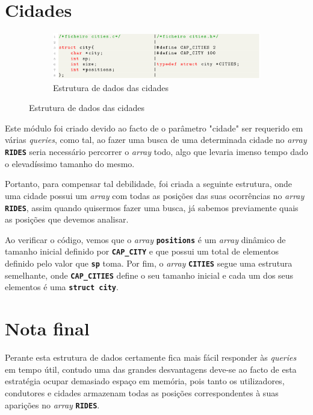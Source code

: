 \documentclass[12pt,a4paper]{report}
\begin{document}
\section{Cidades}

\begin{figure}[hbt!]
    \centering
    \begin{subfigure}{\textwidth}
        \centering
        \includegraphics[width=1\linewidth]{images/cities.png}
        \caption*{Estrutura de dados das cidades}
        \label{fig:cities}
    \end{subfigure}
\end{figure}

Este módulo foi criado devido ao facto de o parâmetro "cidade" ser requerido em várias \textit{queries}, como tal, ao fazer uma busca de uma determinada cidade no \textit{array} \textbf{\small\texttt{RIDES}} seria necessário percorrer o \textit{array} todo, algo que levaria imenso tempo dado o elevadíssimo  tamanho do mesmo.

Portanto, para compensar tal debilidade, foi criada a seguinte estrutura, onde uma cidade possui um \textit{array} com todas as posições das suas ocorrências no \textit{array} \textbf{\small\texttt{RIDES}}, assim quando quisermos fazer uma busca, já sabemos previamente quais as posições que devemos analisar.



Ao verificar o código, vemos que o \textit{array} \textbf{\small\texttt{positions}} é um \textit{array} dinâmico de tamanho inicial definido por \textbf{\small\texttt{CAP\_CITY}} e que possui um total de elementos definido pelo valor que \textbf{\small\texttt{sp}} toma. Por fim, o \textit{array} \textbf{\small\texttt{CITIES}}  segue uma estrutura semelhante, onde \textbf{\small\texttt{CAP\_CITIES}} define o seu tamanho inicial e cada um dos seus elementos é uma \textbf{\small\texttt{struct city}}.

\section{Nota final}

Perante esta estrutura de dados certamente fica mais fácil responder às \textit{queries} em tempo útil, contudo uma das grandes desvantagens deve-se ao facto de esta estratégia ocupar demasiado espaço em memória, pois tanto os utilizadores, condutores e cidades armazenam todas as posições correspondentes à suas aparições no \textit{array} \textbf{\small\texttt{RIDES}}.
\end{document}
